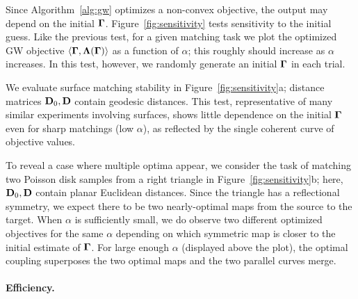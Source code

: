 Since Algorithm~\ref{alg:gw} optimizes a non-convex objective, the output may depend on the initial $\mathbf \Gamma$. Figure~\ref{fig:sensitivity} tests sensitivity to the initial guess.  Like the previous test, for a given matching task we plot the optimized GW objective $\langle \mathbf \Gamma,\mathbf \Lambda(\mathbf \Gamma)\rangle$ as a function of $\alpha$; this roughly should increase as $\alpha$ increases.  In this test, however, we randomly generate an initial $\mathbf \Gamma$ in each trial.%

We evaluate surface matching stability in Figure~\ref{fig:sensitivity}a; distance matrices $\mathbf D_0,\mathbf D$ contain geodesic distances.  This test, representative of many similar experiments involving surfaces, shows little dependence on the initial $\mathbf \Gamma$ even for sharp matchings (low $\alpha$), as reflected by the single coherent curve of objective values.

To reveal a case where multiple optima appear, we consider the task of matching two Poisson disk samples from a right triangle in Figure~\ref{fig:sensitivity}b; here, $\mathbf D_0,\mathbf D$ contain planar Euclidean distances.  Since the triangle has a reflectional symmetry, we expect there to be two nearly-optimal maps from the source to the target.  When $\alpha$ is sufficiently small, we do observe two different optimized objectives for the same $\alpha$ depending on which symmetric map is closer to the initial estimate of $\mathbf \Gamma$.  For large enough $\alpha$ (displayed above the plot), the optimal coupling superposes the two optimal maps and the two parallel curves merge.

\paragraph*{Efficiency.}  

